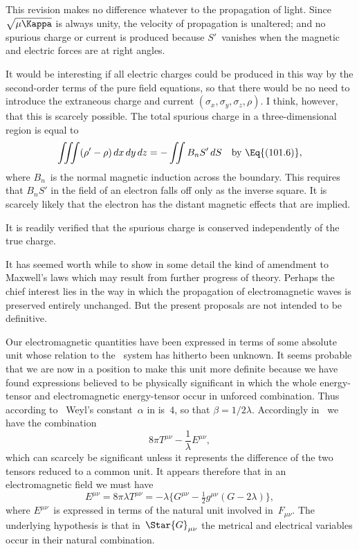\documentclass[12pt]{book}
\begin{document}
This revision makes no difference whatever to the propagation of light.
Since $\sqrt{\mu\Kappa}$ is always unity, the velocity of propagation is unaltered; and no
spurious charge or current is produced because $S'$~vanishes when the magnetic
and electric forces are at right angles.

It would be interesting if all electric charges could be produced in this
way by the second-order terms of the pure field equations, so that there would
be no need to introduce the extraneous charge and current $(\sigma_{x}, \sigma_{y}, \sigma_{z}, \rho)$.
I think, however, that this is scarcely possible. The total spurious charge in
a three-dimensional region is equal to
\[
\iiint (\rho' - \rho)\, dx\, dy\, dz
= -\iint B_{n}S'\, dS\quad\text{by~\Eq{(101.6)},}
\]
where $B_{n}$~is the normal magnetic induction across the boundary. This requires
that $B_{n}S'$ in the field of an electron falls off only as the inverse square. It is
scarcely likely that the electron has the distant magnetic effects that are implied.

It is readily verified that the spurious charge is conserved independently
of the true charge.

It has seemed worth while to show in some detail the kind of amendment
to Maxwell's laws which may result from further progress of theory. Perhaps
the chief interest lies in the way in which the propagation of electromagnetic
waves is preserved entirely unchanged. But the present proposals are not
intended to be definitive.


Our electromagnetic quantities have been expressed in terms of some
absolute unit whose relation to the \CGS\ system has hitherto been unknown.
It seems probable that we are now in a position to make this unit more
definite because we have found expressions believed to be physically significant
in which the whole energy-tensor and electromagnetic energy-tensor
occur in unforced combination. Thus according to~ Weyl's constant~$\alpha$
in  is~$4$, so that $\beta = 1/2\lambda$. Accordingly in~ we have the combination
\[
8\pi T^{\mu\nu} - \frac{1}{\lambda} E^{\mu\nu},
\]
which can scarcely be significant unless it represents the difference of the two
tensors reduced to a common unit. It appears therefore that in an electromagnetic
field we must have
\[
E^{\mu\nu} = 8\pi\lambda T^{\mu\nu}
= -\lambda\bigl\{G^{\mu\nu} - \tfrac{1}{2} g^{\mu\nu}(G - 2\lambda)\bigr\},
\]
where $E^{\mu\nu}$~is expressed in terms of the natural unit involved in~$F_{\mu\nu}$. The
underlying hypothesis is that in~$\Star{G}_{\mu\nu}$ the metrical and electrical variables
occur in their natural combination.
\end{document}
